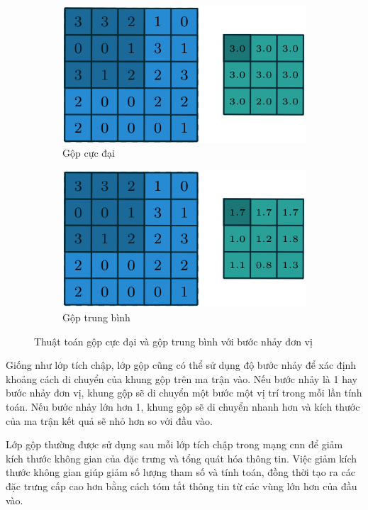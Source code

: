\begin{figure}[h]
	\centering
	\begin{subfigure}{.4\textwidth}
		\centering
		\includegraphics[width=.9\linewidth]{images/max-pooling}
		\caption{Gộp cực đại}
		\label{fig:max-pooling}
	\end{subfigure}

	\begin{subfigure}{.4\textwidth}
		\centering
		\includegraphics[width=.9\linewidth]{images/avg-pooling}
		\caption{Gộp trung bình}
		\label{fig:avg-pooling}
	\end{subfigure} %
	\caption{Thuật toán gộp cực đại và gộp trung bình với bước nhảy đơn vị}
\end{figure}

Giống như lớp tích chập, lớp gộp cũng có thể sử dụng độ bước nhảy để xác định khoảng cách di chuyển của khung gộp trên ma trận vào. Nếu bước nhảy là 1 hay bước nhảy đơn vị, khung gộp sẽ di chuyển một bước một vị trí trong mỗi lần tính toán. Nếu bước nhảy lớn hơn 1, khung gộp sẽ di chuyển nhanh hơn và kích thước của ma trận kết quả sẽ nhỏ hơn so với đầu vào.

Lớp gộp thường được sử dụng sau mỗi lớp tích chập trong mạng \acrshort{cnn} để giảm kích thước không gian của đặc trưng và tổng quát hóa thông tin. Việc giảm kích thước không gian giúp giảm số lượng tham số và tính toán, đồng thời tạo ra các đặc trưng cấp cao hơn bằng cách tóm tắt thông tin từ các vùng lớn hơn của đầu vào.

